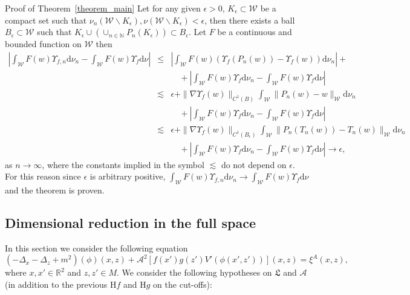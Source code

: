 \documentclass[a4paper,10pt]{article}
\newcommand{\mathd}{\mathrm{d}}
\newenvironment{proof*}[1]{\noindent\textbf{#1\ }}{\hspace*{\fill}$\Box$\medskip}
\begin{document}
\begin{proof*}{Proof of Theorem~\ref{theorem_main}}
  Let for any given $\epsilon > 0$, $K_{\epsilon} \subset \mathcal{W}$ be a
  compact set such that $\nu_n (\mathcal{W} \backslash K_{\epsilon}), \nu
  (\mathcal{W} \backslash K_{\epsilon}) < \epsilon$, then there exists a ball
  $B_{\epsilon} \subset \mathcal{W}$ such that $K_{\epsilon} \cup (\cup_{n \in
  \mathbb{N}} P_n (K_{\epsilon})) \subset B_{\epsilon}$. Let $F$ be a
  continuous and bounded function on $\mathcal{W}$ then
  \begin{eqnarray}
    \left| \int_{\mathcal{W}} F (w) \Upsilon_{f, n} \mathd \nu_n -
    \int_{\mathcal{W}} F (w) \Upsilon_f \mathd \nu \right| & \leqslant &
    \left| \int_{\mathcal{W}} F (w) (\Upsilon_f (P_n (w)) - \Upsilon_f (w))
    \mathd \nu_n \right| + \nonumber\\
    &  & \quad + \left| \int_{\mathcal{W}} F (w) \Upsilon_f \mathd \nu_n -
    \int_{\mathcal{W}} F (w) \Upsilon_f \mathd \nu \right| \nonumber\\
    & \lesssim & \epsilon + \| \nabla \Upsilon_f (w) \|_{C^1 (B)}
    \int_{\mathcal{W}} \| P_n (w) - w \|_{\mathcal{W}} \mathd \nu_n
    \nonumber\\
    &  & \quad + \left| \int_{\mathcal{W}} F (w) \Upsilon_f \mathd \nu_n -
    \int_{\mathcal{W}} F (w) \Upsilon_f \mathd \nu \right| \nonumber\\
    & \lesssim & \epsilon + \| \nabla \Upsilon_f (w) \|_{C^1 (B_{\epsilon})}
    \int_{\mathcal{W}} \| P_n (T_n (w)) - T_n (w) \|_{\mathcal{W}} \mathd
    \nu_n \nonumber\\
    &  & \quad + \left| \int_{\mathcal{W}} F (w) \Upsilon_f \mathd \nu_n -
    \int_{\mathcal{W}} F (w) \Upsilon_f \mathd \nu \right| \rightarrow
    \epsilon, \nonumber
  \end{eqnarray}
  as $n \rightarrow \infty$, where the constants implied in the symbol
  $\lesssim$ do not depend on $\epsilon$. For this reason since $\epsilon$ is
  arbitrary positive, $\int_{\mathcal{W}} F (w) \Upsilon_{f, n} \mathd \nu_n
  \rightarrow \int_{\mathcal{W}} F (w) \Upsilon_f \mathd \nu$ and the theorem
  is proven.
\end{proof*}

\subsection{Dimensional reduction in the full
space}\label{subsection_extension1}

In this section we consider the following equation
\begin{equation}
  (- \Delta_x - \Delta_z + m^2) (\phi) (x, z) + \mathcal{A}^2 [f (x') g (z')
  V' (\phi (x', z'))] (x, z) = \xi^A (x, z) \label{eq:extension1},
\end{equation}
where $x, x' \in \mathbb{R}^2$ and $z, z' \in M$. We consider the following
hypotheses on $\mathfrak{L}$ and $\mathcal{A}$ (in addition to the previous
H$f$ and H$g$ on the cut-offs):
\end{document}
